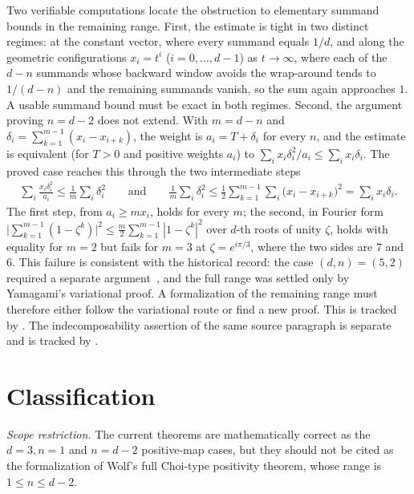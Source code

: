 \documentclass{article}
\begin{document}
Two verifiable computations locate the obstruction to elementary summand
bounds in the remaining range.  First, the estimate is tight in two distinct
regimes: at the constant vector, where every summand equals \(1/d\), and
along the geometric configurations \(x_i=t^i\) (\(i=0,\dots,d-1\)) as
\(t\to\infty\), where each of the \(d-n\) summands whose backward window
avoids the wrap-around tends to \(1/(d-n)\) and the remaining summands
vanish, so the sum again approaches \(1\).  A usable summand bound must be
exact in both regimes.  Second, the argument proving \(n=d-2\) does not
extend.  With \(m=d-n\) and
\(\delta_i=\sum_{k=1}^{m-1}(x_i-x_{i+k})\), the weight is \(a_i=T+\delta_i\)
for every \(n\), and the estimate is equivalent (for \(T>0\) and positive
weights \(a_i\)) to \(\sum_i x_i\delta_i^2/a_i\le\sum_i x_i\delta_i\).  The proved case reaches
this through the two intermediate steps
\begin{align}
  \sum_i \frac{x_i\delta_i^2}{a_i}\le\frac1m\sum_i\delta_i^2
  \qquad\text{and}\qquad
  \frac1m\sum_i\delta_i^2
  \le\frac12\sum_{k=1}^{m-1}\sum_i\bigl(x_i-x_{i+k}\bigr)^2
  =\sum_i x_i\delta_i .
\end{align}
The first step, from \(a_i\ge m x_i\), holds for every \(m\); the second, in
Fourier form
\(\bigl|\sum_{k=1}^{m-1}(1-\zeta^k)\bigr|^2
\le\tfrac m2\sum_{k=1}^{m-1}|1-\zeta^k|^2\) over \(d\)-th roots of unity
\(\zeta\), holds with equality for \(m=2\) but fails for \(m=3\) at
\(\zeta=e^{i\pi/3}\), where the two sides are \(7\) and \(6\).  This failure
is consistent with the historical record: the case \((d,n)=(5,2)\) required a
separate argument~\cite{Osaka1991Indecomposable}, and the full range was
settled only by Yamagami's variational proof.  A formalization of the
remaining range must therefore either follow the variational route or find a
new proof.  This is tracked by .  The indecomposability
assertion of the same source paragraph is separate and is tracked by
.

\section{Classification}

\emph{Scope restriction.}  The current theorems are mathematically correct as
the \(d=3,n=1\) and \(n=d-2\) positive-map cases, but they should not be cited
as the formalization of Wolf's full Choi-type positivity theorem, whose range
is \(1\le n\le d-2\).



\end{document}

